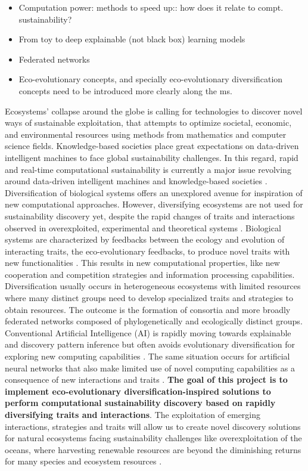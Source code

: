 \documentclass[12pt,a4paper]{article}
\begin{document}
\begin{itemize}
    \item Computation power: methods to speed up:: how does it relate to compt. sustainability?
    \item From toy to deep explainable (not black box) learning models
    \item Federated networks
    \item Eco-evolutionary concepts, and specially eco-evolutionary diversification concepts need to be introduced more clearly along the ms.
\end{itemize}
Ecosystems’ collapse around the globe is calling for technologies to discover novel ways of sustainable exploitation, that attempts to optimize societal, economic, and environmental resources using methods from mathematics and computer science fields. Knowledge-based societies place great expectations on data-driven intelligent machines to face global sustainability challenges. In this regard, rapid and real-time computational sustainability is currently a major issue revolving around data-driven intelligent machines and knowledge-based societies \cite{Gomesetal2019}. Diversification of biological systems offers an unexplored avenue for inspiration of new computational approaches. However, diversifying ecosystems are not used for sustainability discovery yet, despite the rapid changes of traits and interactions observed in overexploited, experimental and theoretical systems \cite{Hairston2005,Walsh2006,Fussmann2007,Trugman8532}. Biological systems are characterized by feedbacks between the ecology and evolution of interacting traits, the eco-evolutionary feedbacks, to produce novel traits with new functionalities \cite{Govaertetal2019}. This results in new computational properties, like new cooperation and competition strategies and information processing capabilities. Diversification usually occurs in heterogeneous ecosystems with limited resources where many distinct groups need to develop specialized traits and strategies to obtain resources. The outcome is the formation of consortia and more broadly federated networks composed of phylogenetically and ecologically distinct groups. Conventional Artificial Intelligence (AI) is rapidly moving towards explainable and discovery pattern inference \cite{Iten2020a} but often avoids evolutionary diversification for exploring new computing capabilities \cite{Real2020}. The same situation occurs for artificial neural networks that also make limited use of novel computing capabilities as a consequence of new interactions and traits \cite{Schmidhuber:2015}. \textbf{The goal of this project is to implement eco-evolutionary diversification-inspired solutions to perform computational sustainability discovery based on rapidly diversifying traits and interactions}. The exploitation of emerging interactions, strategies and traits will allow us to create novel discovery solutions for natural ecosystems facing sustainability challenges like overexploitation of the oceans, where harvesting renewable resources are beyond the diminishing returns for many species and ecosystem resources \cite{Paulyetal1998,Mastrangelo2019}. \\
\end{document}
